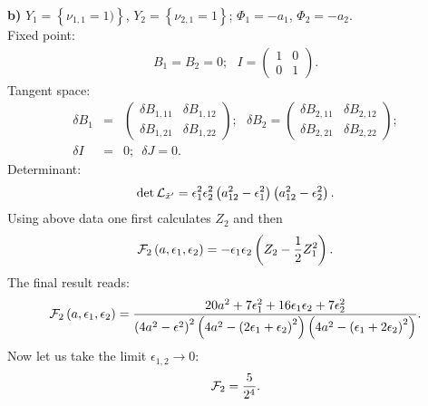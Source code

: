 \documentclass[a4paper,12pt]{article}
\begin{document}
{\bf b)} $Y_1=\left\{\nu_{1,1}=1)\right\}$, $Y_2=\left\{\nu_{2,1}=1\right\}$; $\Phi_1=-a_1$, $\Phi_2=-a_2$. \\
Fixed point:
\begin{eqnarray}
B_1=B_2=0; \, \, \, \, I=\left(\begin{array}{cc} 1 & 0 \\ 0 & 1
\end{array}\right).
\end{eqnarray}
Tangent space:
\begin{eqnarray}
\delta B_1 &=& \left(\begin{array}{cc} \delta B_{1,11} & \delta B_{1,12} \\ \delta B_{1,21} & \delta B_{1,22}
\end{array}\right); \, \, \, \,
\delta B_2 =\left(\begin{array}{cc} \delta B_{2,11} & \delta B_{2,12} \\ \delta B_{2,21} & \delta B_{2,22}
\end{array}\right); \nonumber \\ \delta I &=& 0; \, \, \, \delta J=0.
\end{eqnarray}
Determinant:
\begin{equation}
\det {\cal L}_{{\tilde x}'}=\epsilon_1^2 \epsilon_2^2
\left(a_{12}^2-\epsilon_1^2 \right)\left(a_{12}^2-\epsilon_2^2
\right).
\end{equation}
Using above data one first calculates $Z_2$ and then
\[ {\cal F}_2\left(a, \epsilon_1,\epsilon_2\right)=-\epsilon_1 \epsilon_2 \left( Z_2-\frac{1}{2} Z_1^2\right). \]
The final result reads:
\begin{equation}
{\cal F}_2\left(a, \epsilon_1, \epsilon_2\right)=\frac{20 a^2 + 7 \epsilon_1^2 + 16 \epsilon_1 \epsilon_2 + 7
\epsilon_2^2}{\left(4a^2 - \epsilon^2 \right)^2  \left(4a^2 - \left( 2\epsilon_1 + \epsilon_2\right)^2 \right)
 \left(4a^2 - \left(\epsilon_1 + 2\epsilon_2 \right)^2 \right)}.
\end{equation}
Now let us take the limit $\epsilon_{1,2}\rightarrow 0$:
\[
{\cal F}_2=\frac{5}{2^{4}}.
\]
\end{document}
